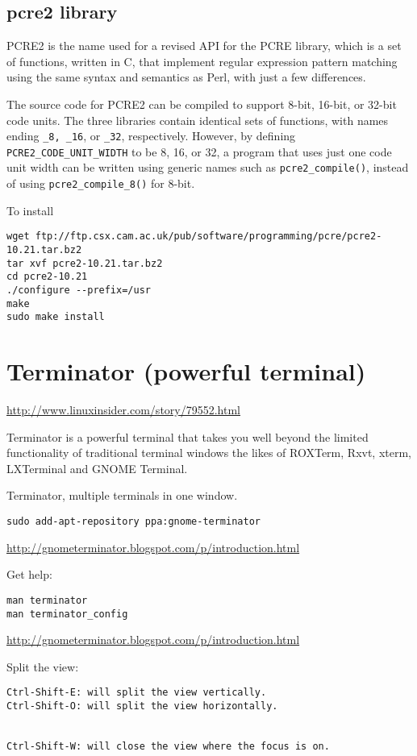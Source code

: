 \subsection{pcre2 library}
\label{sec:pcre2-library}

PCRE2 is the name used for a revised API for the PCRE library, which is a set of
functions, written in C, that implement regular expression pattern matching
using the same syntax and semantics as Perl, with just a few differences.

The source code for PCRE2 can be compiled to support 8-bit, 16-bit, or 32-bit
code units. The three libraries contain identical sets of functions, with names
ending \verb!_8, _16!, or \verb!_32!, respectively.
However, by defining \verb!PCRE2_CODE_UNIT_WIDTH! to be 8, 16, or 32, a program
that uses just one code unit width can be written using generic names such as
\verb!pcre2_compile()!, instead of using \verb!pcre2_compile_8()! for 8-bit.

To install
\begin{verbatim}
wget ftp://ftp.csx.cam.ac.uk/pub/software/programming/pcre/pcre2-10.21.tar.bz2
tar xvf pcre2-10.21.tar.bz2
cd pcre2-10.21
./configure --prefix=/usr
make
sudo make install
\end{verbatim}


\section{Terminator (powerful terminal)}
\label{sec:terminator}

\url{http://www.linuxinsider.com/story/79552.html}

Terminator is a powerful terminal that takes you well beyond the limited
functionality of traditional terminal windows the likes of ROXTerm, Rxvt, xterm,
LXTerminal and GNOME Terminal.



Terminator, multiple terminals in one window. 
\begin{verbatim}
sudo add-apt-repository ppa:gnome-terminator
\end{verbatim}
\url{http://gnometerminator.blogspot.com/p/introduction.html}

Get help:
\begin{verbatim}
man terminator
man terminator_config
\end{verbatim}
\url{http://gnometerminator.blogspot.com/p/introduction.html}

Split the view:
\begin{verbatim}
Ctrl-Shift-E: will split the view vertically.
Ctrl-Shift-O: will split the view horizontally.


Ctrl-Shift-W: will close the view where the focus is on.

\end{verbatim}

